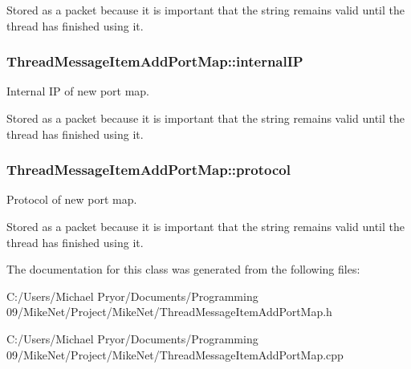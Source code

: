 Stored as a packet because it is important that the string remains valid until the thread has finished using it. \hypertarget{class_thread_message_item_add_port_map_adfd5ac5864623818534ae91fc80b7192}{
\subsubsection[{internalIP}]{ {\bf ThreadMessageItemAddPortMap::internalIP}}}
\label{class_thread_message_item_add_port_map_adfd5ac5864623818534ae91fc80b7192}


Internal IP of new port map. 

Stored as a packet because it is important that the string remains valid until the thread has finished using it. \hypertarget{class_thread_message_item_add_port_map_a7dab0698e5517343896ba6960ec04c55}{
\subsubsection[{protocol}]{ {\bf ThreadMessageItemAddPortMap::protocol}}}
\label{class_thread_message_item_add_port_map_a7dab0698e5517343896ba6960ec04c55}


Protocol of new port map. 

Stored as a packet because it is important that the string remains valid until the thread has finished using it. 

The documentation for this class was generated from the following files:\begin{DoxyCompactItemize}
\item 
C:/Users/Michael Pryor/Documents/Programming 09/MikeNet/Project/MikeNet/ThreadMessageItemAddPortMap.h\item 
C:/Users/Michael Pryor/Documents/Programming 09/MikeNet/Project/MikeNet/ThreadMessageItemAddPortMap.cpp\end{DoxyCompactItemize}
